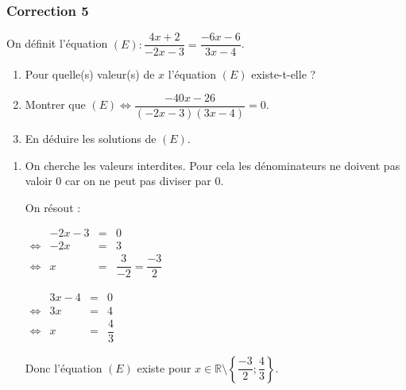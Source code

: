 \documentclass[15pt, mathserif]{beamer}
\newcommand{\R}{\mathbb{R}}			%
\begin{document}
\begin{frame}
\vspace{-10mm}
	\frametitle{Correction 5}
 \vspace*{1cm} 
 
 On définit l'équation $(E):\dfrac{4x+2}{-2x-3}=\dfrac{-6x-6}{3x-4}$. 
 \begin{enumerate} 
 	 \item Pour quelle(s) valeur(s) de $x$ l'équation $(E)$ existe-t-elle ? 
 	 \item Montrer que $(E) \Leftrightarrow \dfrac{-40x-26}{(-2x-3)(3x-4)}=0$. 
 	 \item En déduire les solutions de $(E)$. 
 \end{enumerate} 
 
 \begin{enumerate} 
 	 \item On cherche les valeurs interdites. Pour cela les dénominateurs ne doivent pas valoir 0 car on ne peut pas diviser par 0. 
 
 	 On résout : 
 
  \begin{minipage}{0.45\linewidth} 
 	 $\begin{array}{crcl} 
 	 	 & -2x-3& = & 0 \\ 
 	 	 	 \Leftrightarrow &-2x & = &3\\ 
 	 	 	 \Leftrightarrow & x & = & \dfrac{3}{-2}=\dfrac{-3}{2}
 	 	 \end{array} $ 
 	 \end{minipage} \hfil \begin{minipage}{0.45\linewidth} 
 	 $\begin{array}{crcl} 
 	 	 & 3x-4& = & 0 \\ 
 	 	 	 \Leftrightarrow &3x & = &4 \\ 
 	 	 	 \Leftrightarrow & x & = & \dfrac{4}{3}
 	 	 \end{array} $ 
 
 	 \end{minipage} 
 
 Donc l'équation $(E)$ existe pour $x \in \R \setminus \left\{\dfrac{-3}{2};\dfrac{4}{3}\right\}$. 
 \end{enumerate} 
 \end{frame} 
\end{document}
